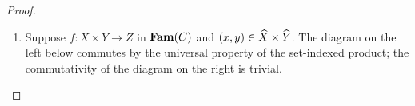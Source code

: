 \begin{proof}
\begin{enumerate}
To show $\lambda_{X,Y,Z}(f^\dagger, g^\dagger) = (f,g)$, suppose $\lambda_{X,Y,Z}(f^\dagger, g^\dagger) = (f',
g')$ with
\begin{itemize}
\item $f'(x) = (f^\dagger \comp (x, -), \reindex{g^\dagger}{(x,-)} \comp \inj_{\faml{Y}}): Y \to Z$ where
$\inj_{\faml{Y}}: \faml{Y} \to \const_{\idx{Y}}(\faml{X}_x) \biprod \faml{Y}$
\item $g'_x = \lambda_{\prod_{\idx{Y}}}(\reindex{g^\dagger}{(x,-)} \comp \inj_{\faml{X}_x}:
\const_{\idx{Y}}(\faml{X}_x) \to \reindex{\faml{Z}}{f^\dagger})$ where $\inj_{\faml{X}_x}:
\const_{\idx{Y}}(\faml{X}_x) \to \const_{\idx{Y}}(\faml{X}_x) \biprod \faml{Y}$
\end{itemize}
\noindent To show $f' = f : \idx{X} \to \Fam(C)(Y,Z)$, suppose $x \in \idx{X}$ and show $f'(x) = f(x): Y \to
Z$. Suppose $y \in \idx{Y}$.
\begin{enumerate}
\item $\idx{f'(x)}(y) = (f^\dagger \comp (x, -))(y) = f^\dagger(x,y) = \idx{f(x)}(y)$.
\item $\faml{f'(x)}_y = (\reindex{g^\dagger}{(x,-)} \comp \inj_{\faml{Y}})_y = \reindex{g^\dagger}{(x,-)}_y \comp
{\inj_{\faml{Y}}}_y = g^\dagger_{x,y} \comp {\inj_{\faml{Y}}}_y = \coprodM{{\eval_{\prod}}_y \comp
g_x}{\faml{f(x)}_y} \comp {\inj_{\faml{Y}}}_y = \faml{f(x)}_y$.
\end{enumerate}

To show $g' = g$, suppose $x \in \idx{X}$.
\begin{align*}
\small
g'_x
&=
\lambda_{\prod_{\idx{Y}}}(\reindex{g^\dagger}{(x,-)} \comp \inj_{\faml{X}_x}) \\
&=
\lambda_{\prod_{\idx{Y}}}(\{g^\dagger_{(x,y)} \comp (\inj_{\faml{X}_x})_y\}_{y \in \idx{Y}}) \\
&=
\lambda_{\prod_{\idx{Y}}}(\{\coprodM{{\eval_{\prod}}_y \comp g_x}{\faml{f(x)}_y} \comp (\inj_{\faml{X}_x})_y\}_{y \in \idx{Y}}) \\
&=
\lambda_{\prod_{\idx{Y}}}(\{{\eval_{\prod}}_y \comp g_x\}_{y \in \idx{Y}}) \\
&=
g_x
\end{align*}
\qed

\item Suppose $f: X \times Y \to Z$ in $\mathbf{Fam}(C)$ and
$(x, y) \in \widehat{X} \times \widehat{Y}$. The diagram on the left below commutes by the universal property of the
set-indexed product; the commutativity of the diagram on the right is trivial.


\end{enumerate}
\end{proof}
